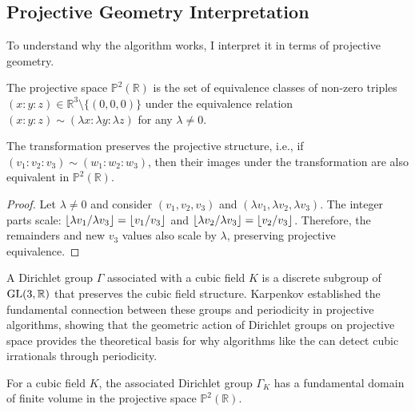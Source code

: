 \subsection{Projective Geometry Interpretation}

To understand why the \HAPD{} algorithm works, I interpret it in terms of projective geometry.

\begin{definition}
The projective space $\mathbb{P}^2(\mathbb{R})$ is the set of equivalence classes of non-zero triples $(x : y : z) \in \mathbb{R}^3 \setminus \{(0,0,0)\}$ under the equivalence relation $(x : y : z) \sim (\lambda x : \lambda y : \lambda z)$ for any $\lambda \neq 0$.
\end{definition}

\begin{proposition}\label{prop:projective_invariance}
The \HAPD{} transformation preserves the projective structure, i.e., if $(v_1 : v_2 : v_3) \sim (w_1 : w_2 : w_3)$, then their images under the \HAPD{} transformation are also equivalent in $\mathbb{P}^2(\mathbb{R})$.
\end{proposition}

\begin{proof}
Let $\lambda \neq 0$ and consider $(v_1, v_2, v_3)$ and $(\lambda v_1, \lambda v_2, \lambda v_3)$. The integer parts scale: $\lfloor \lambda v_1/\lambda v_3 \rfloor = \lfloor v_1/v_3 \rfloor$ and $\lfloor \lambda v_2/\lambda v_3 \rfloor = \lfloor v_2/v_3 \rfloor$. Therefore, the remainders and new $v_3$ values also scale by $\lambda$, preserving projective equivalence.
\end{proof}

\begin{definition}
A Dirichlet group $\Gamma$ associated with a cubic field $K$ is a discrete subgroup of $\operatorname{GL}(3,\mathbb{R})$ that preserves the cubic field structure. Karpenkov \cite{Karpenkov2022} established the fundamental connection between these groups and periodicity in projective algorithms, showing that the geometric action of Dirichlet groups on projective space provides the theoretical basis for why algorithms like the \HAPD{} can detect cubic irrationals through periodicity.
\end{definition}

\begin{theorem}\label{thm:finite_domain}
For a cubic field $K$, the associated Dirichlet group $\Gamma_K$ has a fundamental domain of finite volume in the projective space $\mathbb{P}^2(\mathbb{R})$.
\end{theorem}

